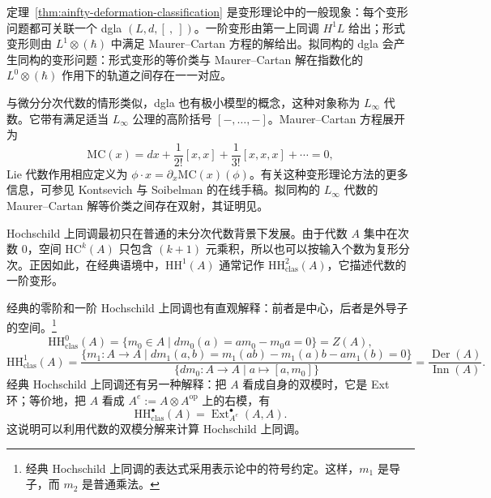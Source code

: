 \begin{note}\label{note:dgla-deformation-theory}
定理~\ref{thm:ainfty-deformation-classification} 是变形理论中的一般现象：每个变形问题都可关联一个 dgla $(L,d,[\ ,\ ])$。一阶变形由第一上同调 $H^1L$ 给出；形式变形则由 $L^1\otimes(\hbar)$ 中满足 Maurer--Cartan 方程的解给出。拟同构的 dgla 会产生同构的变形问题：形式变形的等价类与 Maurer--Cartan 解在指数化的 $L^0\otimes(\hbar)$ 作用下的轨道之间存在一一对应。

与微分分次代数的情形类似，dgla 也有极小模型的概念，这种对象称为 $L_\infty$ 代数。它带有满足适当 $L_\infty$ 公理的高阶括号 $[-,\ldots,-]$。Maurer--Cartan 方程展开为
\[
  \mathrm{MC}(x)=dx+\frac1{2!}[x,x]+\frac1{3!}[x,x,x]+\cdots=0,
\]
Lie 代数作用相应定义为 $\phi\cdot x=\partial_x\mathrm{MC}(x)(\phi)$。有关这种变形理论方法的更多信息，可参见 Kontsevich 与 Soibelman 的在线手稿。拟同构的 $L_\infty$ 代数的 Maurer--Cartan 解等价类之间存在双射，其证明见。
\end{note}

\begin{note}
Hochschild 上同调最初只在普通的未分次代数背景下发展。由于代数 $A$ 集中在次数 $0$，空间 $\mathrm{HC}^k(A)$ 只包含 $(k+1)$ 元乘积，所以也可以按输入个数为复形分次。正因如此，在经典语境中，$\mathrm{HH}^1(A)$ 通常记作 $\mathrm{HH}^2_{\mathrm{clas}}(A)$，它描述代数的一阶变形。

经典的零阶和一阶 Hochschild 上同调也有直观解释：前者是中心，后者是外导子的空间。\footnote{经典 Hochschild 上同调的表达式采用表示论中的符号约定。这样，$m_1$ 是导子，而 $m_2$ 是普通乘法。}
\[
  \mathrm{HH}^0_{\mathrm{clas}}(A)=\{m_0\in A\mid dm_0(a)=am_0-m_0a=0\}=Z(A),
\]
\[
  \mathrm{HH}^1_{\mathrm{clas}}(A)
  =\frac{\{m_1:A\to A\mid dm_1(a,b)=m_1(ab)-m_1(a)b-am_1(b)=0\}}
  {\{dm_0:A\to A\mid a\mapsto[a,m_0]\}}
  =\frac{\operatorname{Der}(A)}{\operatorname{Inn}(A)}.
\]
经典 Hochschild 上同调还有另一种解释：把 $A$ 看成自身的双模时，它是 Ext 环；等价地，把 $A$ 看成 $A^e:=A\otimes A^{\mathrm{op}}$ 上的右模，有
\[
  \mathrm{HH}^{\bullet}_{\mathrm{clas}}(A)=\operatorname{Ext}^{\bullet}_{A^e}(A,A).
\]
这说明可以利用代数的双模分解来计算 Hochschild 上同调。
\end{note}

